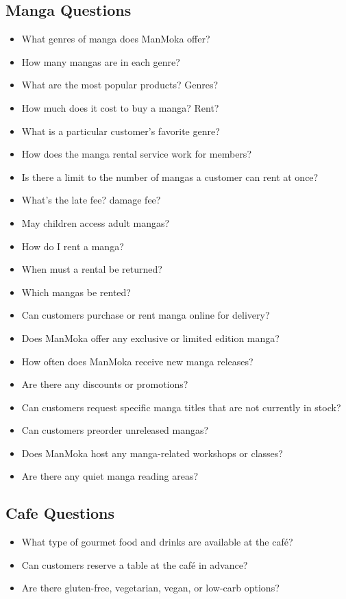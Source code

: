\documentclass{article}
\begin{document}
\subsection*{Manga Questions}
\begin{itemize}
\item What genres of manga does ManMoka offer?
\item How many mangas are in each genre?
\item What are the most popular products? Genres?
\item How much does it cost to buy a manga? Rent?
\item What is a particular customer's favorite genre?
\item How does the manga rental service work for members?
\item Is there a limit to the number of mangas a customer can rent at once?
\item What's the late fee? damage fee?
\item May children access adult mangas?
\item How do I rent a manga?
\item When must a rental be returned?
\item Which mangas be rented?
\item Can customers purchase or rent manga online for delivery?
\item Does ManMoka offer any exclusive or limited edition manga?
\item How often does ManMoka receive new manga releases?
\item Are there any discounts or promotions?
\item Can customers request specific manga titles that are not currently in stock?
\item Can customers preorder unreleased mangas?
\item Does ManMoka host any manga-related workshops or classes?
\item Are there any quiet manga reading areas?
\end{itemize}

\subsection*{Cafe Questions}

\begin{itemize}
\item What type of gourmet food and drinks are available at the café?
\item Can customers reserve a table at the café in advance?
\item Are there gluten-free, vegetarian, vegan, or low-carb options?
\end{itemize}
\end{document}
